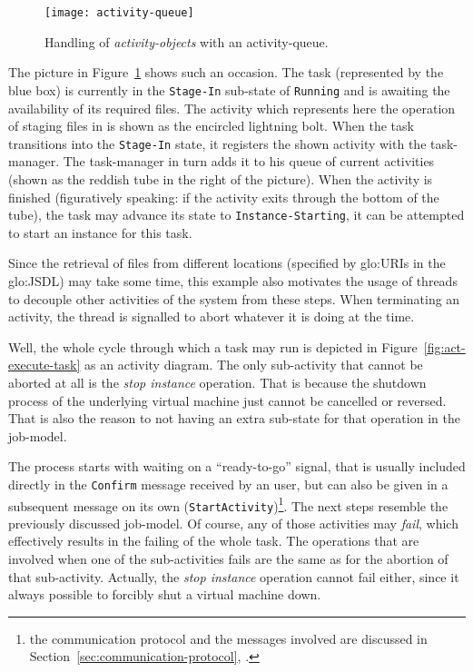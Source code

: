 \begin{figure}[ht]
  \centering
  \texttt{[image: activity-queue]}
  \caption{Handling of \emph{activity-objects} with an activity-queue.}
  \label{fig:activity-queue}
\end{figure}

The picture in Figure~\ref{fig:activity-queue} shows such an occasion. The
task (represented by  the blue box) is currently  in the \texttt{Stage-In}
sub-state  of \texttt{Running}  and is  awaiting the  availability  of its
required  files.  The  activity  which represents  here  the operation  of
staging files in is shown as  the encircled lightning bolt.  When the task
transitions  into  the \texttt{Stage-In}  state,  it  registers the  shown
activity with  the task-manager. The task-manager  in turn adds  it to his
queue of current activities (shown as the reddish tube in the right of the
picture).  When  the activity is  finished (figuratively speaking:  if the
activity exits through  the bottom of the tube), the  task may advance its
state to \texttt{Instance-Starting}, \ie it  can be attempted to start an
instance for this task.

Since  the  retrieval of  files  from  different  locations (specified  by
\gls{glo:URI}s  in the \gls{glo:JSDL})  may take  some time,  this example
also motivates  the usage of threads  to decouple other  activities of the
system  from these  steps. When  terminating  an activity,  the thread  is
signalled to abort whatever it is doing at the time.

\bigskip

Well,  the  whole cycle  through  which  a task  may  run  is depicted  in
Figure~\ref{fig:act-execute-task}  as  an   activity  diagram.   The  only
sub-activity that  cannot be aborted  at all is the  \emph{stop instance}
operation. That is because the  shutdown process of the underlying virtual
machine just cannot be cancelled or  reversed. That is also the reason to
not having an extra sub-state for that operation in the job-model.

The  process starts  with waiting  on  a ``ready-to-go''  signal, that  is
usually included  directly in the \texttt{Confirm} message  received by an
user,  but  can  also  be  given  in  a  subsequent  message  on  its  own
(\texttt{Start\-Activity})\footnote{the  communication  protocol  and  the
  messages           involved          are           discussed          in
  Section~\ref{sec:communication-protocol},
  \emph{}.}.  The  next steps resemble
the previously discussed job-model. Of course, any of those activities may
\emph{fail}, which effectively  results in the failing of  the whole task.
The operations that are involved  when one of the sub-activities fails are
the  same  as  for  the  abortion of  that  sub-activity.   Actually,  the
\emph{stop  instance}  operation  cannot  fail  either,  since  it  always
possible to forcibly shut a virtual machine down.

